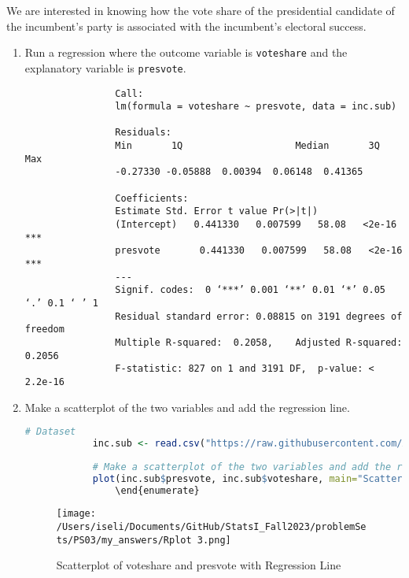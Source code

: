 \documentclass[12pt,letterpaper]{article}
\begin{document}
\noindent We are interested in knowing how the vote share of the presidential candidate of the incumbent's party is associated with the incumbent's electoral success.
	\vspace{.25cm}
	\begin{enumerate}
		\item Run a regression where the outcome variable is \texttt{voteshare} and the explanatory variable is \texttt{presvote}.
			\vspace{0.05cm}
			
				\begin{verbatim}
				Call:
				lm(formula = voteshare ~ presvote, data = inc.sub)
				
				Residuals:
				Min       1Q   					Median       3Q      Max  
				-0.27330 -0.05888  0.00394  0.06148  0.41365 
				
				Coefficients:
				Estimate Std. Error t value Pr(>|t|)    
				(Intercept)   0.441330   0.007599   58.08   <2e-16 ***
				presvote       0.441330   0.007599   58.08   <2e-16 ***
				---
				Signif. codes:  0 ‘***’ 0.001 ‘**’ 0.01 ‘*’ 0.05 ‘.’ 0.1 ‘ ’ 1
				Residual standard error: 0.08815 on 3191 degrees of freedom
				Multiple R-squared:  0.2058,	Adjusted R-squared:  0.2056 
				F-statistic: 827 on 1 and 3191 DF,  p-value: < 2.2e-16
			\end{verbatim}
			
		\item Make a scatterplot of the two variables and add the regression line. 
			\begin{lstlisting}[language=R]
			# Dataset
			inc.sub <- read.csv("https://raw.githubusercontent.com/ASDS-TCD/StatsI_Fall2023/main/datasets/incumbents_subset.csv")
			
			# Make a scatterplot of the two variables and add the regression line
			plot(inc.sub$presvote, inc.sub$voteshare, main="Scatterplot of presvote and voteshare with Regression Line")abline(lm_model, col="red")
				\end{enumerate}
		\end{lstlisting}			
		\vspace{0.05cm}
		\begin{figure}[h!]
			\centering
			\texttt{[image: /Users/iseli/Documents/GitHub/StatsI\_Fall2023/problemSets/PS03/my\_answers/Rplot 3.png]}
			\caption{Scatterplot of voteshare and presvote with Regression Line}
			\label{fig:scatterplot voteshare and presvote}
		\end{figure}
		

\end{enumerate}
\end{document}
